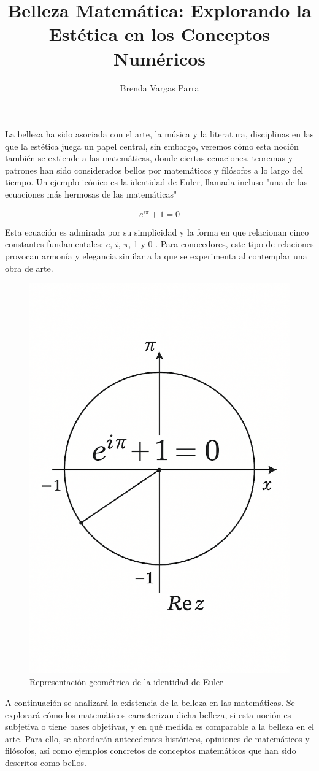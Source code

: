\documentclass[twocolumn]{article}
\title{Belleza Matemática: Explorando la Estética en los Conceptos Numéricos}
\author{Brenda Vargas Parra}
\date{}
\begin{document}
\maketitle


La belleza ha sido asociada con el arte, la música y la literatura, disciplinas en las que la estética juega un papel central, sin embargo, veremos cómo esta noción también se extiende a las matemáticas, donde ciertas ecuaciones, teoremas y patrones han sido considerados bellos por matemáticos y filósofos a lo largo del tiempo. Un ejemplo icónico es la identidad de Euler, llamada incluso "una de las ecuaciones más hermosas de las matemáticas"

\begin{equation}
    e^{i\pi} + 1 = 0
\end{equation}



Esta ecuación es admirada por su simplicidad y la forma en que relacionan cinco constantes fundamentales: $e$, $i$, $\pi$, 1 y 0 \cite{hardy1940}. Para conocedores, este tipo de relaciones provocan armonía y elegancia similar a la que se experimenta al contemplar una obra de arte.


\begin{figure}[h]
    \centering
    \includegraphics[width=0.5\linewidth]{imagen2.png}
    \caption{Representación geométrica de la identidad de Euler}
    \label{fig:enter-label}
\end{figure}

A continuación se analizará la existencia de la belleza en las matemáticas. Se explorará cómo los matemáticos caracterizan dicha belleza, si esta noción es subjetiva o tiene bases objetivas, y en qué medida es comparable a la belleza en el arte. Para ello, se abordarán antecedentes históricos, opiniones de matemáticos y filósofos, así como ejemplos concretos de conceptos matemáticos que han sido descritos como bellos.
\end{document}
